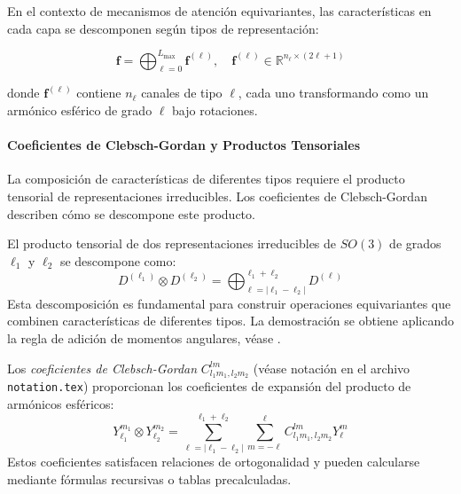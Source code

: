 En el contexto de mecanismos de atención equivariantes, las características en cada capa se descomponen según tipos de representación:

\begin{equation}
    \mathbf{f} = \bigoplus_{\ell=0}^{L_{\max}} \mathbf{f}^{(\ell)}, \quad \mathbf{f}^{(\ell)} \in \mathbb{R}^{n_\ell \times (2\ell+1)}
    \label{eq:irrep_decomposition}
\end{equation}

donde $\mathbf{f}^{(\ell)}$ contiene $n_\ell$ canales de tipo $\ell$, cada uno transformando como un armónico esférico de grado $\ell$ bajo rotaciones.

\paragraph{Coeficientes de Clebsch-Gordan y Productos Tensoriales}

La composición de características de diferentes tipos requiere el producto tensorial de representaciones irreducibles. Los coeficientes de Clebsch-Gordan describen cómo se descompone este producto.

\begin{theorem}\label{thm:tensor_product_so3}
El producto tensorial de dos representaciones irreducibles de $SO(3)$ de grados $\ell_1$ y $\ell_2$ se descompone como:
\begin{equation}
D^{(\ell_1)} \otimes D^{(\ell_2)} = \bigoplus_{\ell=|\ell_1-\ell_2|}^{\ell_1+\ell_2} D^{(\ell)}
\label{eq:tensor_product_decomposition_attention}
\end{equation}
Esta descomposición es fundamental para construir operaciones equivariantes que combinen características de diferentes tipos. La demostración se obtiene aplicando la regla de adición de momentos angulares, véase \citep{brocker1985representations}.
\end{theorem}

\begin{definition}\label{def:clebsch_gordan_attention}
Los \textit{coeficientes de Clebsch-Gordan} $C_{l_1 m_1, l_2 m_2}^{l m}$ (véase notación en el archivo \texttt{notation.tex}) proporcionan los coeficientes de expansión del producto de armónicos esféricos:
\begin{equation}
Y_{\ell_1}^{m_1} \otimes Y_{\ell_2}^{m_2} = \sum_{\ell=|\ell_1-\ell_2|}^{\ell_1+\ell_2} \sum_{m=-\ell}^{\ell} C_{l_1 m_1, l_2 m_2}^{l m} Y_{\ell}^{m}
\label{eq:clebsch_gordan_expansion}
\end{equation}
Estos coeficientes satisfacen relaciones de ortogonalidad y pueden calcularse mediante fórmulas recursivas o tablas precalculadas.
\end{definition}

